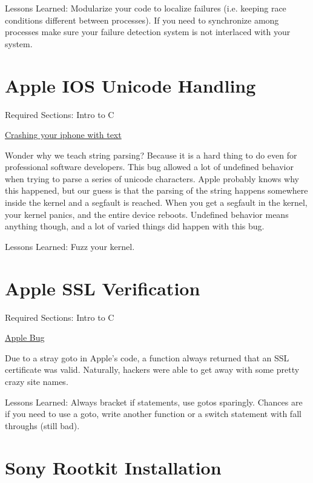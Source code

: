 Lessons Learned: Modularize your code to localize failures (i.e. keeping race conditions different between processes). If you need to synchronize among processes make sure your failure detection system is not interlaced with your system.


\section{Apple IOS Unicode Handling}
\label{pm:ios_unicode}

Required Sections: Intro to C

\href{http://appleinsider.com/articles/15/05/26/bug-in-ios-notifications-handling-crashes-iphones-with-a-simple-text}{Crashing your iphone with text}

Wonder why we teach string parsing? Because it is a hard thing to do even for professional software developers. This bug allowed a lot of undefined behavior when trying to parse a series of unicode characters.
Apple probably knows why this happened, but our guess is that the parsing of the string happens somewhere inside the kernel and a segfault is reached.
When you get a segfault in the kernel, your kernel panics, and the entire device reboots.
Undefined behavior means anything though, and a lot of varied things did happen with this bug.

Lessons Learned: Fuzz your kernel.

\section{Apple SSL Verification}
\label{pm:apple_ssl}

Required Sections: Intro to C

\href{https://en.wikipedia.org/wiki/Unreachable_code#Examples}{Apple Bug}


Due to a stray goto in Apple's code, a function always returned that an SSL certificate was valid.
Naturally, hackers were able to get away with some pretty crazy site names.

Lessons Learned: Always bracket if statements, use gotos sparingly. Chances are if you need to use a goto, write another function or a switch statement with fall throughs (still bad).

\section{Sony Rootkit Installation}
\label{pm:sony_rootkit}

